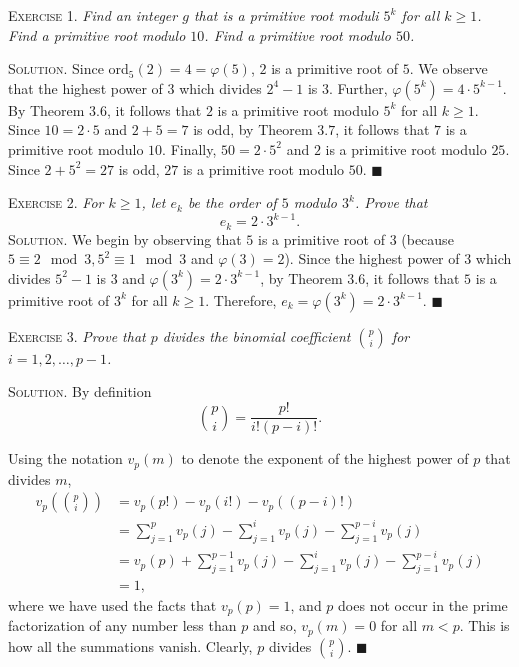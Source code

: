 \documentclass[11pt, leqno]{article}
\newcommand{\done}{\ensuremath{\blacksquare}}
\begin{document}
\textsc{Exercise 1}. \emph{Find an integer $g$ that is a primitive root moduli $5^k$ for all $k \geq 1$. Find a primitive root modulo $10$. Find a primitive root modulo $50$.}

\textsc{Solution}. Since ord$_5(2) = 4 = \varphi(5)$, $2$ is a primitive root of $5$. We observe that the highest power of $3$ which divides $2^4-1$ is $3$. Further, $\varphi(5^k) = 4\cdot 5^{k-1}$. By Theorem $3.6$, it follows that $2$ is a primitive root modulo $5^k$ for all $k\geq 1$. Since $10 = 2\cdot 5$ and $2+5 = 7 $ is odd, by Theorem $3.7$, it follows that $7$ is a primitive root modulo $10$. Finally, $50 = 2 \cdot 5^2$ and $2$ is a primitive root modulo $25$. Since $2+5^2 = 27$ is odd, $27$ is a primitive root modulo $50$. \done

\textsc{Exercise 2}. \emph{For $k \geq 1$, let $e_k$ be the order of $5$ modulo $3^k$. Prove that 
\begin{displaymath}
e_k = 2\cdot 3^{k-1}.
\end{displaymath}}\textsc{Solution}. We begin by observing that $5$ is a primitive root of $3$ (because $5 \equiv 2 \mod 3, 5^2 \equiv 1 \mod 3$ and $\varphi(3) = 2$). Since the highest power of $3$ which divides $5^2-1$ is $3$ and $\varphi(3^k) = 2\cdot 3^{k-1}$, by Theorem $3.6$, it follows that $5$ is a primitive root of $3^k$ for all $k\geq 1$. Therefore, $e_k = \varphi(3^k) = 2\cdot 3^{k-1}$. \done

\textsc{Exercise 3}. \emph{Prove that $p$ divides the binomial coefficient $\binom{p}{i} $ for $i=1,2,\ldots, p-1$.}

\textsc{Solution}. By definition 
\begin{displaymath}
\binom{p}{i} = \frac{p!}{i!(p-i)!}.
\end{displaymath}

Using the notation $v_p(m)$ to denote the exponent of the highest power of $p$ that divides $m$, 
\begin{align*}
  v_p(\binom{p}{i}) &= v_p(p!) - v_p(i!) - v_p((p-i)!) \\
                    &= \sum_{j=1}^p v_p(j) - \sum_{j=1}^i v_p(j) - \sum_{j=1}^{p-i} v_p(j) \\
                    &= v_p(p) + \sum_{j=1}^{p-1} v_p(j) - \sum_{j=1}^i v_p(j) - \sum_{j=1}^{p-i} v_p(j) \\
                    &= 1,
\end{align*}
where we have used the facts that $v_p(p) = 1$, and $p$ does not occur in the prime factorization of any number less than $p$ and so, $v_p(m) = 0$ for all $m < p$. This is how all the summations vanish. Clearly, $p$ divides $\binom{p}{i}$. \done
\end{document}
